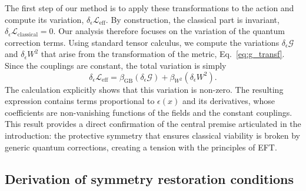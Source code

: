 \documentclass[twocolumn]{aastex631}
\begin{document}
The first step of our method is to apply these transformations to the action and compute its variation, $\delta_\epsilon \mathcal{L}_{\text{eff}}$. By construction, the classical part is invariant, $\delta_\epsilon \mathcal{L}_{\text{classical}} = 0$. Our analysis therefore focuses on the variation of the quantum correction terms. Using standard tensor calculus, we compute the variations $\delta_\epsilon \mathcal{G}$ and $\delta_\epsilon W^2$ that arise from the transformation of the metric, Eq.~\eqref{eq:g_transf}. Since the couplings are constant, the total variation is simply
\begin{equation}
\delta_\epsilon \mathcal{L}_{\text{eff}} = \beta_{\text{GB}} (\delta_\epsilon \mathcal{G}) + \beta_{W^2} (\delta_\epsilon W^2).
\end{equation}
The calculation explicitly shows that this variation is non-zero. The resulting expression contains terms proportional to $\epsilon(x)$ and its derivatives, whose coefficients are non-vanishing functions of the fields and the constant couplings. This result provides a direct confirmation of the central premise articulated in the introduction: the protective symmetry that ensures classical viability is broken by generic quantum corrections, creating a tension with the principles of EFT.

\subsection{Derivation of symmetry restoration conditions}
\end{document}
